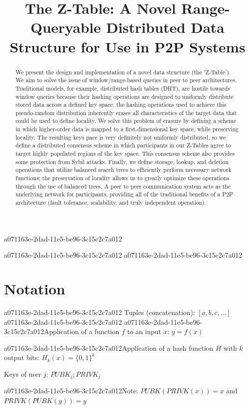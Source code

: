 \documentclass[12pt]{article}
\title{The Z-Table: A Novel Range-Queryable Distributed Data Structure for Use in P2P Systems}
\begin{document}
a071163e-2dad-11e5-be96-3c15c2c7a012
\maketitle

\begin{abstract}
We present the design and implementation of a novel data structure (the 'Z-Table'). We aim to solve the issue of window/range-based queries in peer to peer architectures. Traditional models, for example,  distributed hash tables (DHT), are hostile towards window queries because their hashing operations are designed to uniformly distribute stored data across a defined key space; the hashing operations used to achieve this pseudo-random distribution inherently erases all characteristics of the target data that could be used to define locality. We solve this problem of erasure by defining a scheme in which higher-order data is mapped to a first-dimensional key space, while preserving locality. The resulting keys pace is very definitely not uniformly distributed, so we define a distributed consensus scheme in which participants in our Z-Tables agree to target highly populated regions of the key space. This consensus scheme also provides some protection from Sybil attacks. Finally, we define storage, lookup, and deletion operations that utilize balanced search trees to efficiently perform necessary network functions; the preservation of locality allows us to greatly optimize these operations through the use of balanced trees. A peer to peer communication system acts as the underlying network for participants, providing all of the traditional benefits of a P2P architecture (fault tolerance, scalability, and truly independent operation).
\end{abstract}
a071163e-2dad-11e5-be96-3c15c2c7a012
a071163e-2dad-11e5-be96-3c15c2c7a012\section{Notation}
a071163e-2dad-11e5-be96-3c15c2c7a012
Tuples (concatenation): $[a,b,c,...]$
a071163e-2dad-11e5-be96-3c15c2c7a012
a071163e-2dad-11e5-be96-3c15c2c7a012Application of a function $f$ to an input $x$: $y=f(x)$

a071163e-2dad-11e5-be96-3c15c2c7a012Application of a hash function $H$ with $k$ output bits: $H_{k}(x) = \{0,1\}^k$

Keys of user $j$: $ PUBK_j; PRIVK_j $

a071163e-2dad-11e5-be96-3c15c2c7a012Note: $PUBK(PRIVK(x)) = x$ and $PRIVK(PUBK(y)) = y$~
\end{document}
